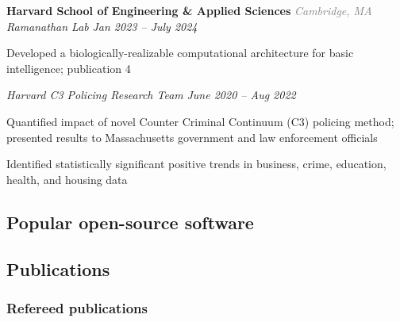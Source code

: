 \documentclass[12pt,letterpaper]{article}
\begin{document}
\vspace{7pt}

\textbf{Harvard School of Engineering \& Applied Sciences} {\small\textit{\textcolor{gray}{Cambridge, MA}}}\\
\textit{Ramanathan Lab} {\small \textit{\hfill \textcolor{niceblue}{Jan 2023 -- July 2024}}}
\begin{bulletdescription}
      \item
            Developed a biologically-realizable computational architecture for basic intelligence; publication 4
\end{bulletdescription}
\textit{Harvard C3 Policing Research Team} {\small \textit{\hfill \textcolor{niceblue}{June 2020 -- Aug 2022}}}
\begin{bulletdescription}
      \item
            Quantified impact of novel Counter Criminal Continuum (C3) policing method; presented results to Massachusetts government and law enforcement officials
      \item
            Identified statistically significant positive trends in business, crime, education, health, and housing data
\end{bulletdescription}


\subsection{Popular open-source software}
\begin{list}{}{\cvlist}
  
\end{list}

\ifdefined\withpubs
  \subsection{Publications}
  

  \subsubsection{Refereed publications}
  \begin{list}{}{\cvlist}
    
  \end{list}
\end{document}
